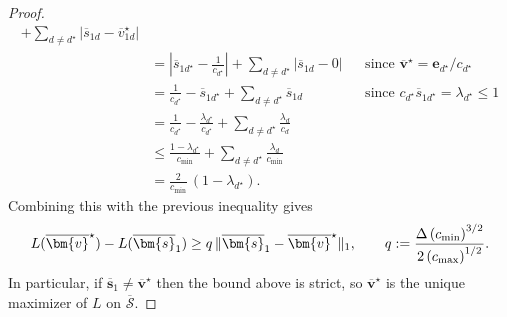 \begin{proof}
\begin{align*}
    +\sum_{d\neq d^\star}\left|\overline{s}_{1d}-\overline{v}_{1d}^\star\right| \\
    &=
    \left|\overline{s}_{1d^\star}-\frac{1}{c_{d^\star}}\right|
    +\sum_{d\neq d^\star}\left|\overline{s}_{1d}-0\right|
    && \text{since }\overline{\bm{v}}^\star=\bm{e}_{d^\star}/c_{d^\star} \\
    &=
    \frac{1}{c_{d^\star}}-\overline{s}_{1d^\star}
    +\sum_{d\neq d^\star}\overline{s}_{1d}
    && \text{since }c_{d^\star}\overline{s}_{1d^\star}=\lambda_{d^\star}\le 1 \\
    &=
    \frac{1}{c_{d^\star}}-\frac{\lambda_{d^\star}}{c_{d^\star}}
    +\sum_{d\neq d^\star}\frac{\lambda_d}{c_d} \\
    &\le
    \frac{1-\lambda_{d^\star}}{c_{\min}}
    +\sum_{d\neq d^\star}\frac{\lambda_d}{c_{\min}} \\
    &=
    \frac{2}{c_{\min}}\,(1-\lambda_{d^\star}).
  \end{align*}
  Combining this with the previous inequality gives
  \begin{equation}
    \label{eq:generic-leading-gap}
    L(\overline{\bm{v}}^\star)-L(\overline{\bm{s}}_1)
    \ge
    q\,\|\overline{\bm{s}}_1-\overline{\bm{v}}^\star\|_1,
    \qquad
    q\defeq \frac{\Delta
    \left(c_{\min}\right)^{3/2}}{2\left(c_{\max}\right)^{1/2}}.
  \end{equation}
  In particular, if $\overline{\bm{s}}_1\neq \overline{\bm{v}}^\star$ then the bound above is strict, so $\overline{\bm{v}}^\star$ is the unique maximizer of $L$ on $\overline{\mathcal{S}}$.


\end{proof}
